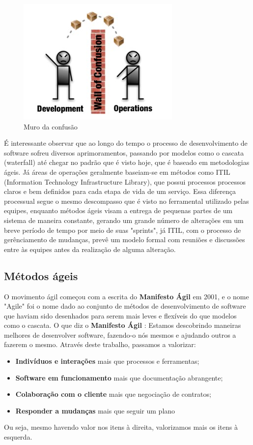 \documentclass[twoside,english,brazilian]{UNISINOSartigo}
\begin{document}
\begin{figure}[h]
    \centering
    \includegraphics[scale=.9]{imagens/wallOfConfusion.jpg}
    \caption{Muro da confusão}
    \label{fig:Muro da confusão}
\end{figure}
É interessante observar que ao longo do tempo o processo de desenvolvimento de software sofreu diversos aprimoramentos, passando por modelos como o cascata (waterfall) até chegar no padrão que é visto hoje, que é baseado em metodologias ágeis. Já áreas de operações geralmente baseiam-se em métodos como ITIL (Information Technology Infrastructure Library), que possui processos processos claros e bem definidos para cada etapa de vida de um serviço. Essa diferença processual segue o mesmo descompasso que é visto no ferramental utilizado pelas equipes, enquanto métodos ágeis visam a entrega de pequenas partes de um sistema de maneira constante, gerando um grande número de alterações em um breve período de tempo por meio de suas "sprints", já ITIL, com o processo de gerênciamento de mudanças, prevê um modelo formal com reuniões e discussões entre às equipes antes da realização de alguma alteração. 

\subsection{Métodos ágeis}
O movimento ágil começou com a escrita do \textbf{Manifesto Ágil} em 2001, e o nome "Agile" foi o nome dado ao conjunto de métodos de desenvolvimento de software que haviam sido desenhados para serem mais leves e flexíveis do que modelos como o cascata.
O que diz o  \textbf{Manifesto Ágil} :  \newline
Estamos descobrindo maneiras melhores de desenvolver 
software, fazendo-o nós mesmos e ajudando outros a 
fazerem o mesmo. Através deste trabalho, passamos a valorizar: 
\begin{itemize}
\item \textbf{Indivíduos e interações} mais que processos e ferramentas;
\item \textbf{Software em funcionamento} mais que documentação abrangente;
\item \textbf{Colaboração com o cliente} mais que negociação de contratos;
\item \textbf{Responder a mudanças} mais que seguir um plano
\end{itemize}
Ou seja, mesmo havendo valor nos itens à direita, valorizamos mais os itens à esquerda. \newline
\end{document}
